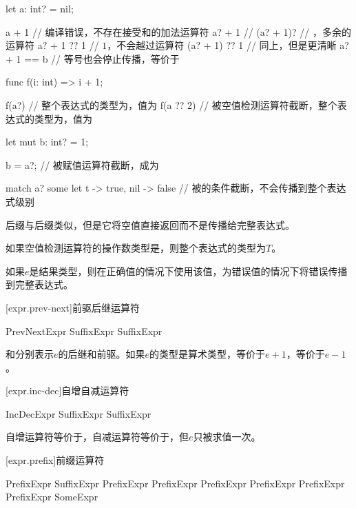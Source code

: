 \enterexample
\begin{codeblock}
let a: int? = nil;

a + 1 // 编译错误，不存在接受和的加法运算符
a? + 1 // 
(a? + 1)? // ，多余的运算符
a? + 1 ?? 1 // $1$，不会越过运算符
(a? + 1) ?? 1 // 同上，但是更清晰
a? + 1 == b // 等号也会停止传播，等价于

func f(i: int) => i + 1;

f(a?) // 整个表达式的类型为，值为
f(a ?? 2) // 被空值检测运算符截断，整个表达式的类型为，值为

let mut b: int? = 1;

b = a?; // 被赋值运算符截断，成为

match a? { some let t -> true, nil -> false } // 被的条件截断，不会传播到整个表达式级别
\end{codeblock}
\exitexample

\pnum
后缀\tcode{!}与后缀类似，但是它将空值直接返回而不是传播给完整表达式。

\pnum
如果空值检测运算符的操作数类型是，则整个表达式的类型为$T$。

\pnum
如果$e$是结果类型，则在正确值的情况下使用该值，为错误值的情况下将错误传播到完整表达式。

[expr.prev-next]{前驱后继运算符}

\begin{bnf}{PrevNextExpr}
    SuffixExpr \terminal{+!} \br
    SuffixExpr \terminal{-!}
\end{bnf}

\pnum
{}和分别表示$e$的后继和前驱。如果$e$的类型是算术类型，等价于$e+1$，等价于$e-1$。

[expr.inc-dec]{自增自减运算符}

\begin{bnf}{IncDecExpr}
    SuffixExpr \terminal{++} \br
    SuffixExpr \terminal{--}
\end{bnf}

\pnum
自增运算符等价于，自减运算符等价于，但$e$只被求值一次。

[expr.prefix]{前缀运算符}

\begin{bnf}{PrefixExpr}
    SuffixExpr \br
    \terminal{+} PrefixExpr \br
    \terminal{-} PrefixExpr \br
    \terminal{!} PrefixExpr \br
     PrefixExpr \br
    \terminal{\&} \bnfq PrefixExpr \br
    \terminal{*} PrefixExpr \br
    SomeExpr
\end{bnf}

